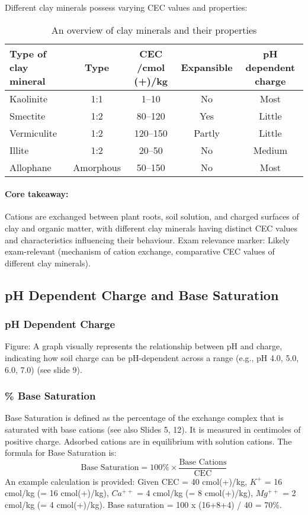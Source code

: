 Different clay minerals possess varying CEC values and properties: 
\begin{table}[h]
    \centering
    \caption{An overview of clay minerals and their properties}
    \label{tab:clay_minerals}
    \begin{tabular}{ l | c | c | c | c }
        \textbf{Type of clay mineral} & \textbf{Type} & \textbf{CEC /cmol (+)/kg} & \textbf{Expansible} & \textbf{pH dependent charge} \\ 
        \hline
        Kaolinite   & 1:1       & 1--10    & No     & Most   \\ 
        Smectite    & 1:2       & 80--120  & Yes    & Little \\ 
        Vermiculite & 1:2       & 120--150 & Partly & Little \\ 
        Illite      & 1:2       & 20--50   & No     & Medium \\ 
        Allophane   & Amorphous & 50--150  & No     & Most   \\ 
    \end{tabular}
\end{table}

\paragraph*{Core takeaway:} 
Cations are exchanged between plant roots, soil solution, and charged surfaces of clay and organic matter, with different clay minerals having distinct CEC values and characteristics influencing their behaviour. Exam relevance marker: Likely exam-relevant (mechanism of cation exchange, comparative CEC values of different clay minerals).

\subsection{pH Dependent Charge and Base Saturation} \subsubsection{pH Dependent Charge} 
Figure: A graph visually represents the relationship between pH and charge, indicating how soil charge can be pH-dependent across a range (e.g., pH 4.0, 5.0, 6.0, 7.0) (see slide 9).

\subsubsection{\% Base Saturation} 
Base Saturation is defined as the percentage of the exchange complex that is saturated with base cations (see also Slides 5, 12). It is measured in centimoles of positive charge. Adsorbed cations are in equilibrium with solution cations. The formula for Base Saturation is: $$ \text{Base Saturation} = \text{100\%} \times \frac{\text{Base Cations}}{\text{CEC}} $$ An example calculation is provided: Given CEC = 40 cmol(+)/kg, $K^+$ = 16 cmol/kg (= 16 cmol(+)/kg), $Ca^{++}$ = 4 cmol/kg (= 8 cmol(+)/kg), $Mg^{++}$ = 2 cmol/kg (= 4 cmol(+)/kg). Base saturation = 100 x (16+8+4) / 40 = 70\%.

